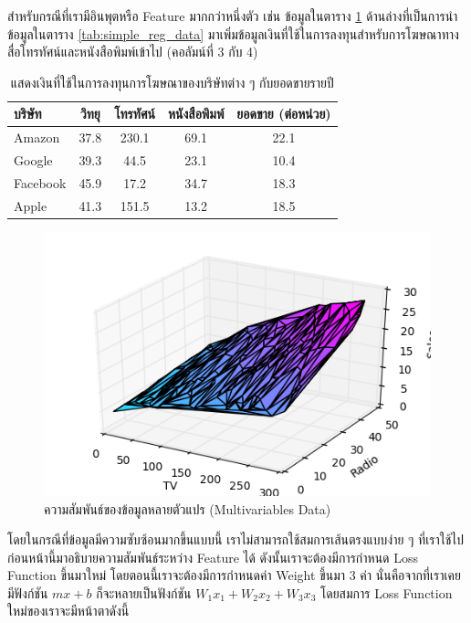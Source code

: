 สำหรับกรณีที่เรามีอินพุตหรือ Feature มากกว่าหนึ่งตัว เช่น ข้อมูลในตาราง \ref{tab:multi_reg_data} ด้านล่างที่เป็นการนำข้อมูลในตาราง 
\ref{tab:simple_reg_data} มาเพิ่มข้อมูลเงินที่ใช้ในการลงทุนสำหรับการโฆษณาทางสื่อโทรทัศน์และหนังสือพิมพ์เข้าไป (คอลัมน์ที่ 3 กับ 4) 

\begin{table}[htbp]
    \centering
    \caption{แสดงเงินที่ใช้ในการลงทุนการโฆษณาของบริษัทต่าง ๆ กับยอดขายรายปี}
    \label{tab:multi_reg_data}
    \small
    \begin{tabular}{lcccc}\toprule
    \textbf{บริษัท} &\textbf{วิทยุ} &\textbf{โทรทัศน์} &\textbf{หนังสือพิมพ์} &\textbf{ยอดขาย (ต่อหน่วย)} \\\midrule
    Amazon &37.8 &230.1 &69.1 &22.1 \\
    Google &39.3 &44.5 &23.1 &10.4 \\
    Facebook &45.9 &17.2 &34.7 &18.3 \\
    Apple &41.3 &151.5 &13.2 &18.5 \\
    \bottomrule
    \end{tabular}
\end{table}

\begin{figure}[htbp]
    \centering
    \includegraphics[width=0.8\linewidth]{fig/plot_multivar_reg.png}
    \caption{ความสัมพันธ์ของข้อมูลหลายตัวแปร (Multivariables Data)}
    \label{fig:multi_var_reg}
\end{figure}

โดยในกรณีที่ข้อมูลมีความซับซ้อนมากขึ้นแบบนี้ เราไม่สามารถใช้สมการเส้นตรงแบบง่าย ๆ ที่เราใช้ไปก่อนหน้านี้มาอธิบายความสัมพันธ์ระหว่าง Feature
ได้ ดังนั้นเราจะต้องมีการกำหนด Loss Function ขึ้นมาใหม่ โดยตอนนี้เราจะต้องมีการกำหนดค่า Weight ขึ้นมา 3 ค่า นั่นคือจากที่เราเคยมีฟังก์ชัน 
$mx + b$ ก็จะหลายเป็นฟังก์ชัน $W_1 x_1 + W_2 x_2 + W_3 x_3$ โดยสมการ Loss Function ใหม่ของเราจะมีหน้าตาดังนี้

